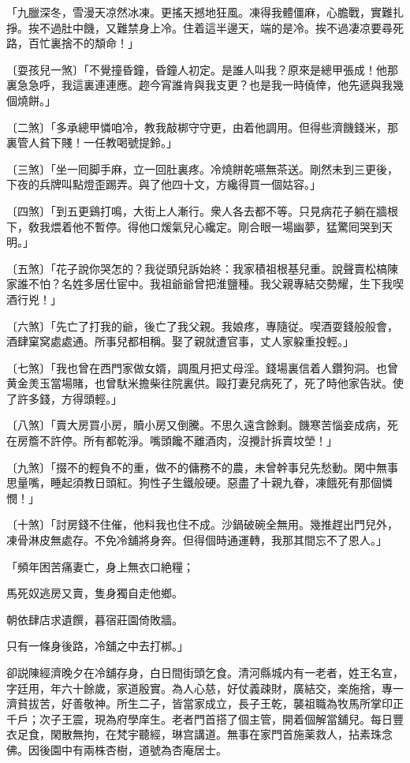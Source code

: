 \begin{myquote}
「九臘深冬，雪漫天凉然冰凍。更搖天撼地狂風。凍得我體僵麻，心膽戰，實難扎掙。挨不過肚中饑，又難禁身上冷。住着這半邊天，端的是冷。挨不過凄凉要尋死路，百忙裏捨不的頽命！」

{\markfont〔耍孩兒一煞〕}「不覺撞昏鐘，昏鐘人初定。是誰人叫我？原來是總甲張成！他那裏急急呼，我這裏連連應。趂今宵誰肯與我支更？也是我一時僥倖，他先遞與我幾個燒餅。」

{\markfont〔二煞〕}「多承總甲憐咱冷，教我敲梆守守更，由着他調用。但得些濟饑錢米，那裏管人貧下賤！一任教喝號提鈴。」

{\markfont〔三煞〕}「坐一囘脚手麻，立一回肚裏疼。冷燒餅乾嚥無茶送。剛然未到三更後，下夜的兵牌叫點燈歪踢弄。與了他四十文，方纔得買一個姑容。」

{\markfont〔四煞〕}「到五更鷄打鳴，大街上人漸行。衆人各去都不等。只見病花子躺在牆根下，敎我煨着他不暫停。得他口煖氣兒心纔定。剛合眼一場幽夢，猛驚囘哭到天明。」

{\markfont〔五煞〕}「花子說你哭怎的？我従頭兒訴始終：我家積祖根基兒重。說聲賣松槁陳家誰不怕？名姓多居仕宦中。我祖爺爺曾把淮鹽種。我父親專結交勢耀，生下我喫酒行兇！」

{\markfont〔六煞〕}「先亡了打我的爺，後亡了我父親。我娘疼，專隨従。喫酒耍錢般般會，酒肆窠窝處處通。所事兒都相稱。娶了親就遭官事，丈人家躱重投輕。」

{\markfont〔七煞〕}「我也曾在西門家做女婿，調風月把丈母淫。錢場裏信着人鑽狗洞。也曾黄金羙玉當場賭，也曾馱米擔柴往院裏供。毆打妻兒病死了，死了時他家告狀。使了許多錢，方得頭輕。」

{\markfont〔八煞〕}「賣大房買小房，贖小房又倒騰。不思久遠含餘剩。饑寒苦惱妾成病，死在房簷不許停。所有都乾淨。嘴頭饞不離酒肉，沒攪計拆賣坟塋！」

{\markfont〔九煞〕}「掇不的輕負不的重，做不的傭務不的農，未曾幹事兒先愁動。閑中無事思量嘴，睡起須教日頭紅。狗性子生鐵般硬。惡盡了十親九眷，凍餓死有那個憐憫！」

{\markfont〔十煞〕}「討房錢不住催，他料我也住不成。沙鍋破碗全無用。幾推趕出門兒外，凍骨淋皮無處存。不免冷舖將身奔。但得個時通運轉，我那其間忘不了恩人。」

「頻年困苦痛妻亡，身上無衣口絶糧；

馬死奴逃房又賣，隻身獨自走他鄉。

朝依肆店求遺饌，暮宿莊園倚敗牆。

只有一條身後路，冷舖之中去打梆。」
\end{myquote}

卻説陳經濟晚夕在冷舖存身，白日間街頭乞食。清河縣城内有一老者，姓王名宣，字廷用，年六十餘歲，家道殷實。為人心慈，好仗義疎財，廣結交，楽施捨，專一濟貧拔苦，好善敬神。所生二子，皆當家成立，長子王乾，襲祖職為牧馬所掌印正千戶；次子王震，現為府學庠生。老者門首搭了個主管，開着個解當舖兒。每日豐衣足食，閑散無拘，在梵宇聽經，琳宫講道。無事在家門首施薬救人，拈素珠念佛。因後園中有兩株杏樹，道號為杏庵居士。

